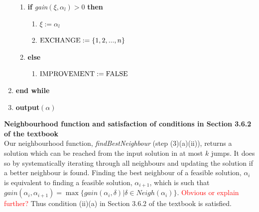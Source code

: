 \documentclass[12pt,a4paper,reqno]{article}
\begin{document}
\begin{enumerate}
\begin{enumerate}
\item \textbf{if} \textit{gain}$(\xi,\alpha_l) > 0$ \textbf{then}
\begin{enumerate}
\item[] $\xi:=\alpha_l$
\item[] $\textnormal{EXCHANGE} := \{1,2,...,n\}$
\end{enumerate}
\item[] \textbf{else}
\begin{enumerate}
\item[] $\textnormal{IMPROVEMENT} := \textnormal{FALSE}$
\end{enumerate}
\end{enumerate}
\item[] \textbf{end while}
\item \textbf{output}$(\alpha)$
\end{enumerate}

\textbf{Neighbourhood function and satisfaction of conditions in Section 3.6.2 of the textbook} \\
Our neighbourhood function, \textit{findBestNeighbour} (step (3)(a)(ii)), returns a solution which can be reached from the input solution in at most $k$ jumps. It does so by systematically iterating through all neighbours and updating the solution if a better neighbour is found. Finding the best neighbour of a feasible solution, $\alpha_i$ is equivalent to finding a feasible solution, $\alpha_{i+1}$, which is such that $gain(\alpha_i,\alpha_{i+1})=\max\{gain(\alpha_i,\delta) | \delta\in Neigh(\alpha_i)\}$. \textcolor{red}{Obvious or explain further?} Thus condition (ii)(a) in Section 3.6.2 of the textbook is satisfied.\\
\end{document}
